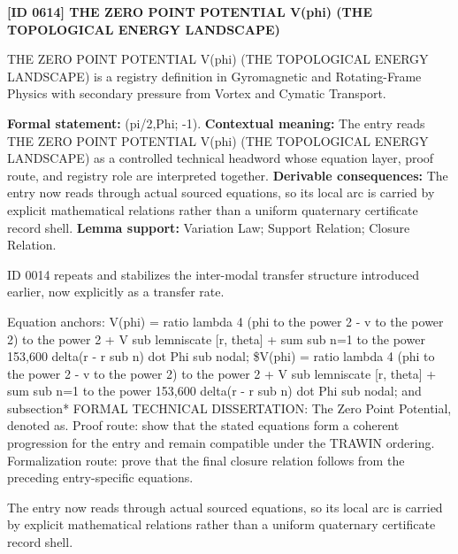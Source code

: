 \clearpage
\noindent\textbf{[ID 0614] THE ZERO POINT POTENTIAL V(phi) (THE TOPOLOGICAL ENERGY LANDSCAPE)}\par
\vspace{0.35em}
\begingroup\small
{}
THE ZERO POINT POTENTIAL V(phi) (THE TOPOLOGICAL ENERGY LANDSCAPE) is a registry definition in Gyromagnetic and Rotating-Frame Physics with secondary pressure from Vortex and Cymatic Transport.

\begingroup\footnotesize\setlength{\emergencystretch}{3em}\sloppy
\textbf{Formal statement:} (pi/2,Phi; -1). \textbf{Contextual meaning:} The entry reads THE ZERO POINT POTENTIAL V(phi) (THE TOPOLOGICAL ENERGY LANDSCAPE) as a controlled technical headword whose equation layer, proof route, and registry role are interpreted together. \textbf{Derivable consequences:} The entry now reads through actual sourced equations, so its local arc is carried by explicit mathematical relations rather than a uniform quaternary certificate record shell. \textbf{Lemma support:} Variation Law; Support Relation; Closure Relation.\par
\endgroup

ID 0014 repeats and stabilizes the inter-modal transfer structure introduced earlier, now explicitly as a transfer rate.

Equation anchors: V(phi) = ratio lambda 4 (phi to the power 2 - v to the power 2) to the power 2 + V sub lemniscate [r, theta] + sum sub n=1 to the power 153,600 delta(r - r sub n) dot Phi sub nodal; \$V(phi) = ratio lambda 4 (phi to the power 2 - v to the power 2) to the power 2 + V sub lemniscate [r, theta] + sum sub n=1 to the power 153,600 delta(r - r sub n) dot Phi sub nodal; and subsection* FORMAL TECHNICAL DISSERTATION: The Zero Point Potential, denoted as. Proof route: show that the stated equations form a coherent progression for the entry and remain compatible under the TRAWIN ordering. Formalization route: prove that the final closure relation follows from the preceding entry-specific equations.

The entry now reads through actual sourced equations, so its local arc is carried by explicit mathematical relations rather than a uniform quaternary certificate record shell.
\endgroup

